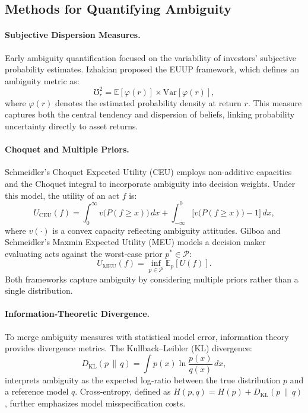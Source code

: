 \documentclass[preprint,12pt,authoryear]{elsarticle}
\begin{document}
\subsection{Methods for Quantifying Ambiguity}

\paragraph{Subjective Dispersion Measures.} Early ambiguity quantification focused on the variability of investors' subjective probability estimates. Izhakian \cite{izhakian2020} proposed the EUUP framework, which defines an ambiguity metric as:
\begin{equation}
\mho^2_r = \mathbb{E}[\varphi(r)] \times \mathrm{Var}[\varphi(r)],
\end{equation}
where $\varphi(r)$ denotes the estimated probability density at return $r$. This measure captures both the central tendency and dispersion of beliefs, linking probability uncertainty directly to asset returns.

\paragraph{Choquet and Multiple Priors.} Schmeidler's Choquet Expected Utility (CEU) \cite{schmeidler1989} employs non‑additive capacities and the Choquet integral to incorporate ambiguity into decision weights. Under this model, the utility of an act $f$ is:
\begin{equation}
U_{\mathrm{CEU}}(f)=\int_0^\infty v\bigl(P(f\ge x)\bigr)\,dx + \int_{-\infty}^0 \bigl[v\bigl(P(f\ge x)\bigr)-1\bigr]\,dx,
\end{equation}
where $v(\cdot)$ is a convex capacity reflecting ambiguity attitudes. Gilboa and Schmeidler's Maxmin Expected Utility (MEU) \cite{gilboa1989} models a decision maker evaluating acts against the worst‑case prior $p^*\in\mathcal{P}$:
\begin{equation}
U_{\mathrm{MEU}}(f)=\inf_{p\in\mathcal{P}}\mathbb{E}_p[U(f)].
\end{equation}
Both frameworks capture ambiguity by considering multiple priors rather than a single distribution.

\paragraph{Information‑Theoretic Divergence.} To merge ambiguity measures with statistical model error, information theory provides divergence metrics. The Kullback–Leibler (KL) divergence:
\begin{equation}
D_{\mathrm{KL}}(p\,\|\,q)=\int p(x)\ln\frac{p(x)}{q(x)}\,dx,
\end{equation}
interprets ambiguity as the expected log‑ratio between the true distribution $p$ and a reference model $q$. Cross‑entropy, defined as $H(p,q)=H(p)+D_{\mathrm{KL}}(p\,\|\,q)$, further emphasizes model misspecification costs.
\end{document}
